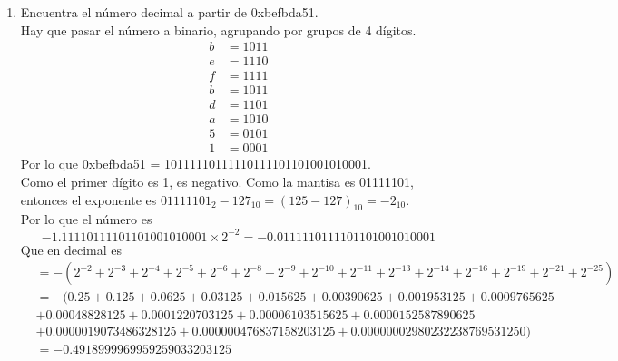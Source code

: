 \documentclass{article}
\begin{document}
\begin{enumerate}
{        }
        \item {
            Encuentra el número decimal a partir de 0xbefbda51.\\
            Hay que pasar el número a binario, agrupando por grupos de 4 dígitos.
            \begin{align*}
                b &= 1011 \\
                e &= 1110 \\
                f &= 1111 \\
                b &= 1011 \\
                d &= 1101 \\
                a &= 1010 \\
                5 &= 0101 \\
                1 &= 0001
            \end{align*}
            Por lo que 0xbefbda51 = 10111110111110111101101001010001. \\
            Como el primer dígito es 1, es negativo. Como la mantisa es 
            01111101, entonces el exponente es $01111101_{2} -127_{10} 
            = (125 - 127)_{10} = -2_{10}$. \\
            Por lo que el número es 
            \[-1.11110111101101001010001 \times 2 ^ {-2} 
            = -0.0111110111101101001010001\]
            Que en decimal es
            \begin{align*}
                &= -(2^{-2} +  2^{-3} +  2^{-4} +  2^{-5} +  2^{-6} 
                +  2^{-8} +  2^{-9} +  2^{-10} +  2^{-11} +  2^{-13} 
                +  2^{-14} +  2^{-16} +  2^{-19} +  2^{-21} +  2^{-25}) \\
                &= -(0.25 + 0.125 + 0.0625 + 0.03125 + 0.015625 + 0.00390625 
                + 0.001953125 + 0.0009765625 \\
                &+ 0.00048828125 + 0.0001220703125 
                + 0.00006103515625 + 0.0000152587890625 \\
                &+ 0.0000019073486328125 + 0.000000476837158203125 
                + 0.00000002980232238769531250) \\
                &= -0.4918999969959259033203125
            \end{align*}
        }
    \end{enumerate}
\end{document}

